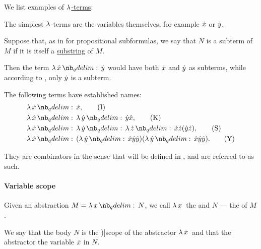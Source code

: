 \begin{example}\label{ex:def:untyped_lambda_term}
  We list examples of \hyperref[def:untyped_lambda_term]{\( \mathrm{\lambda} \)-terms}:
  \begin{thmenum}
     The simplest \( \mathrm{\lambda} \)-terms are the variables themselves, for example \( {\dot{x}} \) or \( {\dot{y}} \).

     Suppose that, as in  for propositional subformulas, we say that \( N \) is a subterm of \( M \) if it is itself a \hyperref[def:formal_language/substring]{substring} of \( M \).

    Then the term \( \qabs \synx \syny \) would have both \( {\dot{x}} \) and \( {\dot{y}} \) as subterms, while according to , only \( {\dot{y}} \) is a subterm.

     The following terms have established names:
    \begin{align}
      &\qabs \synx \synx, \label{eq:ex:def:untyped_lambda_term/combinator/i}\tag{I} \\
      &\qabs \synx \qabs \syny \syny \synx, \nonumber\label{eq:ex:def:untyped_lambda_term/combinator/k}\tag{K} \\
      &\qabs \synx \qabs \syny \qabs \synz \synx \synz (\syny \synz), \label{eq:ex:def:untyped_lambda_term/combinator/s}\tag{S} \\
      &\qabs \synx (\qabs \syny \synx \syny \syny) (\qabs \syny \synx \syny \syny). \label{eq:ex:def:untyped_lambda_term/combinator/y}\tag{Y}
    \end{align}

    They are combinators in the sense that will be defined in , and are referred to as such.
  \end{thmenum}
\end{example}

\paragraph{Variable scope}

\begin{definition}\label{def:lambda_abstractor}
  Given an abstraction \( M = \qabs x N \), we call \( \qabs* x \) the  and \( N \) --- the  of \( M \).

  We say that the body \( N \) is the \term[ru=область действия (\cite[64]{Герасимов2011})]{scope} of the abstractor \( \quantifier* \synlambda \synx \) and that the abstractor  the variable \( {\dot{x}} \) in \( N \).
\end{definition}

